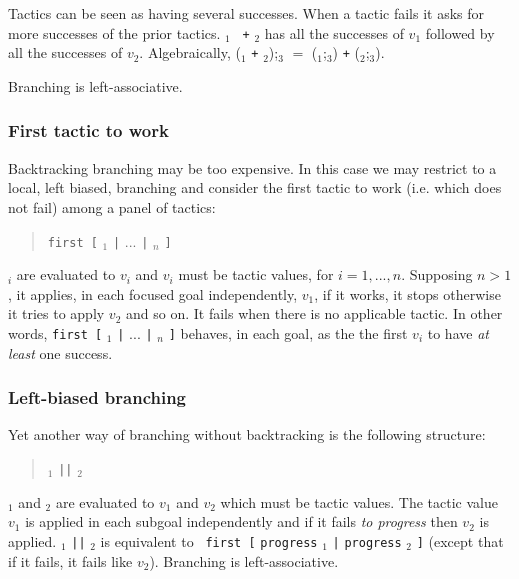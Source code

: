 Tactics can be seen as having several successes. When a tactic fails
it asks for more successes of the prior tactics. {\tacexpr}$_1$ {\tt
  +} {\tacexpr}$_2$ has all the successes of $v_1$ followed by all the
successes of $v_2$. Algebraically, ({\tacexpr}$_1$ {\tt +}
{\tacexpr}$_2$);{\tacexpr}$_3$ $=$ ({\tacexpr}$_1$;{\tacexpr}$_3$)
{\tt +} ({\tacexpr}$_2$;{\tacexpr}$_3$).

Branching is left-associative.

\subsubsection[First tactic to work]{First tactic to work
}

Backtracking branching may be too expensive. In this case we may
restrict to a local, left biased, branching and consider the first
tactic to work (i.e. which does not fail) among a panel of tactics:
\begin{quote}
{\tt first [} {\tacexpr}$_1$ {\tt |} $...$ {\tt |} {\tacexpr}$_n$ {\tt ]}
\end{quote}
{\tacexpr}$_i$ are evaluated to $v_i$ and $v_i$ must be tactic values,
for $i=1,...,n$. Supposing $n>1$, it applies, in each focused goal
independently, $v_1$, if it works, it stops otherwise it tries to
apply $v_2$ and so on. It fails when there is no applicable tactic. In
other words, {\tt first [} {\tacexpr}$_1$ {\tt |} $...$ {\tt |}
  {\tacexpr}$_n$ {\tt ]} behaves, in each goal, as the the first $v_i$
to have \emph{at least} one success.

\ErrMsg {}

\subsubsection[Left-biased branching]{Left-biased branching\tacindex{$\mid\mid$}
}

Yet another way of branching without backtracking is the following structure:
\begin{quote}
{\tacexpr}$_1$ {\tt ||} {\tacexpr}$_2$
\end{quote}
{\tacexpr}$_1$ and {\tacexpr}$_2$ are evaluated to $v_1$ and
$v_2$ which must be tactic values. The tactic value $v_1$ is applied in each
subgoal independently and if it fails \emph{to progress} then $v_2$ is
applied. {\tacexpr}$_1$ {\tt ||} {\tacexpr}$_2$ is equivalent to {\tt
  first [} {\tt progress} {\tacexpr}$_1$ {\tt |} {\tt progress}
  {\tacexpr}$_2$ {\tt ]} (except that if it fails, it fails like
$v_2$). Branching is left-associative.

